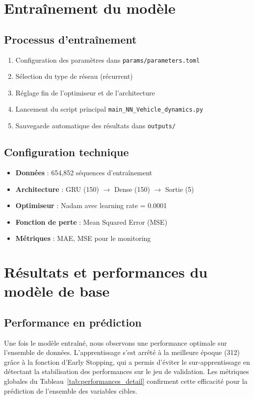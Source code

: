 \documentclass[12pt, a4paper]{report}
\begin{document}
\section{Entraînement du modèle}
\label{sec:entrainement}

\subsection{Processus d'entraînement}
\begin{enumerate}
    \item Configuration des paramètres dans \texttt{params/parameters.toml}
    \item Sélection du type de réseau (récurrent)
    \item Réglage fin de l'optimiseur et de l'architecture
    \item Lancement du script principal \texttt{main\_NN\_Vehicle\_dynamics.py}
    \item Sauvegarde automatique des résultats dans \texttt{outputs/}
\end{enumerate}

\subsection{Configuration technique}
\begin{itemize}
    \item \textbf{Données} : 654,852 séquences d'entraînement
    \item \textbf{Architecture} : GRU (150) $\rightarrow$ Dense (150) $\rightarrow$ Sortie (5)
    \item \textbf{Optimiseur} : Nadam avec learning rate = 0.0001
    \item \textbf{Fonction de perte} : Mean Squared Error (MSE)
    \item \textbf{Métriques} : MAE, MSE pour le monitoring
\end{itemize}


\section{Résultats et performances du modèle de base}
\label{sec:resultats}

\subsection{Performance en prédiction}

Une fois le modèle entraîné, nous observons une performance optimale sur l'ensemble de données. L'apprentissage s'est arrêté à la meilleure époque (312) grâce à la fonction d'Early Stopping, qui a permis d'éviter le sur-apprentissage en détectant la stabilisation des performances sur le jeu de validation. Les métriques globales du Tableau~\ref{tab:performances_detail} confirment cette efficacité pour la prédiction de l'ensemble des variables cibles. 
\end{document}
